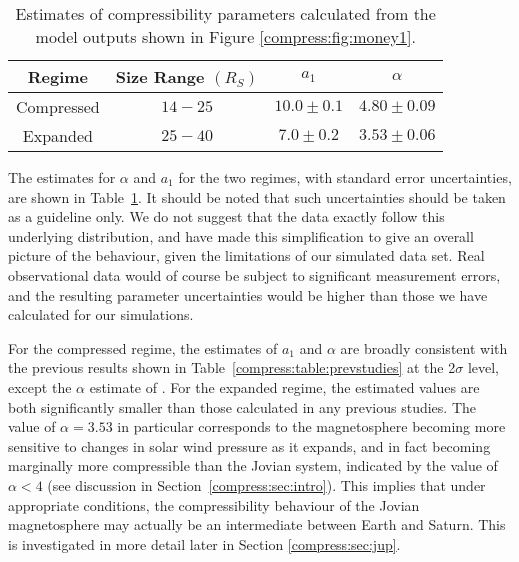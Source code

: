 \begin{table}
\caption[Estimates of compressibility parameters for this study.]{Estimates of compressibility parameters calculated from the model outputs shown in Figure \ref{compress:fig:money1}.}\label{compress:table:money1}
\centering
\begin{tabular}{c c c c}
\hline
Regime & Size Range $(\si{R_S})$ & $a_1$ & $\alpha$  \\
\hline
Compressed & $14 - 25 $ & $10.0 \pm 0.1 $ & $4.80 \pm 0.09$ \\
Expanded & $25 - 40 $ & $7.0 \pm 0.2$ & $3.53 \pm 0.06$ \\
\hline
\end{tabular}
\end{table}
The estimates for $\alpha$ and $a_1$ for the two regimes, with standard error uncertainties, are shown in Table~\ref{compress:table:money1}. It should be noted that such uncertainties should be taken as a guideline only. We do not suggest that the data exactly follow this underlying distribution, and have made this simplification to give an overall picture of the behaviour, given the limitations of our simulated data set. Real observational data would of course be subject to significant measurement errors, and the resulting parameter uncertainties would be higher than those we have calculated for our simulations.

For the compressed regime, the estimates of $a_1$ and $\alpha$ are broadly consistent with the previous results shown in Table~\ref{compress:table:prevstudies} at the 2$\sigma$ level, except the $\alpha$ estimate of \citet{pilkington2015}. For the expanded regime, the estimated values are both significantly smaller than those calculated in any previous studies. The value of $\alpha = 3.53$ in particular corresponds to the magnetosphere becoming more sensitive to changes in solar wind pressure as it expands, and in fact becoming marginally more compressible than the Jovian system, indicated by the value of $\alpha < 4$ (see discussion in Section~\ref{compress:sec:intro}). This implies that under appropriate conditions, the compressibility behaviour of the Jovian magnetosphere may actually be an intermediate between Earth and Saturn. This is investigated in more detail later in Section \ref{compress:sec:jup}.

